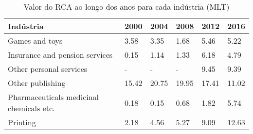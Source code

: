 \begin{table}
\centering
\caption{Valor do RCA ao longo dos anos para cada indústria (MLT)}
\label{tab:ex3-tempo-MLT}
\begin{tabular}{p{6cm}p{1.5cm}p{1.5cm}p{1.5cm}p{1.5cm}p{1.5cm}}
\toprule
                               Indústria &  2000 &  2004 &  2008 &  2012 &  2016 \\
\midrule
                          Games and toys &  3.58 &  3.35 &  1.68 &  5.46 &  5.22 \\
          Insurance and pension services &  0.15 &  1.14 &  1.33 &  6.18 &  4.79 \\
                 Other personal services &     - &     - &     - &  9.45 &  9.39 \\
                        Other publishing & 15.42 & 20.75 & 19.95 & 17.41 & 11.02 \\
Pharmaceuticals medicinal chemicals etc. &  0.18 &  0.15 &  0.68 &  1.82 &  5.74 \\
                                Printing &  2.18 &  4.56 &  5.27 &  9.09 & 12.63 \\
\bottomrule
\end{tabular}
\end{table}
